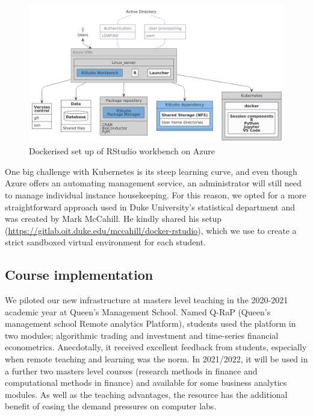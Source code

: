 \documentclass{article}
\begin{document}
\begin{figure}

{\centering \includegraphics[width=0.8\linewidth]{img/rstudiowb_kb} 

}

\caption{Dockerised set up of RStudio workbench on Azure}\label{fig:future-setup}
\end{figure}

One big challenge with Kubernetes is its steep learning curve, and even
though Azure offers an automating management service, an administrator
will still need to manage individual instance housekeeping. For this
reason, we opted for a more straightforward approach used in Duke
University's statistical department and was created by Mark McCahill. He
kindly shared his setup
(\url{https://gitlab.oit.duke.edu/mccahill/docker-rstudio}), which we
use to create a strict sandboxed virtual environment for each student.

\hypertarget{course-implementation}{%
\subsection{Course implementation}\label{course-implementation}}

We piloted our new infrastructure at masters level teaching in the
2020-2021 academic year at Queen's Management School. Named Q-RaP
(Queen's management school Remote analytics Platform), students used the
platform in two modules; algorithmic trading and investment and
time-series financial econometrics. Anecdotally, it received excellent
feedback from students, especially when remote teaching and learning was
the norm. In 2021/2022, it will be used in a further two masters level
courses (research methods in finance and computational methods in
finance) and available for some business analytics modules. As well as
the teaching advantages, the resource has the additional benefit of
easing the demand pressures on computer labs.
\end{document}
